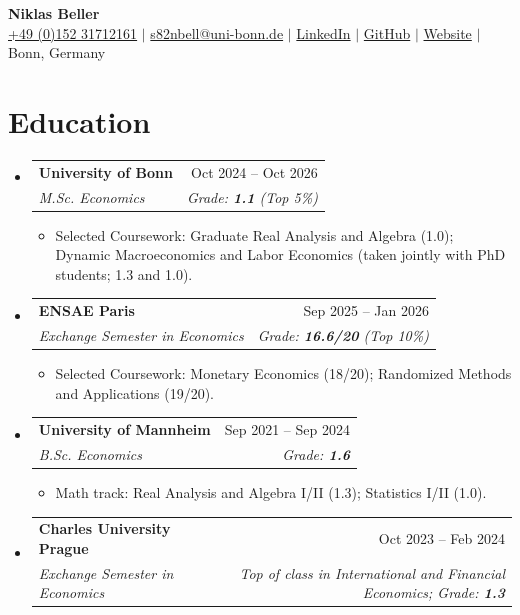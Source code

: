 \documentclass[a4paper,10pt]{article}
\makeatletter
\newcommand{\resumeItem}[1]{
  \item\small{{#1 \vspace{-2pt}}}
}
\newcommand{\gradevalue}[1]{{\bfseries\normalsize #1}}
\newcommand{\resumeSubheading}[4]{
  \vspace{-2pt}\item
    \begin{tabular*}{0.97\textwidth}[t]{l@{\extracolsep{\fill}}r}
      \textbf{#1} & #2 \\
      \textit{\small #3} & \textit{\small #4} \\
    \end{tabular*}\vspace{-7pt}
}
\newcommand{\resumeSubHeadingListStart}{\begin{itemize}[leftmargin=0.15in, label={}]}
\newcommand{\resumeSubHeadingListEnd}{\end{itemize}}
\newcommand{\resumeItemListStart}{\begin{itemize}[leftmargin=0.2in, itemsep=1pt, parsep=0pt, topsep=2pt]}
\newcommand{\resumeItemListEnd}{\end{itemize}\vspace{-6pt}}
\makeatother
\begin{document}
\begin{center}
    {\Huge \bfseries Niklas Beller} \\ \vspace{4pt}
    \small
    \faMobile \hspace{.5pt} \href{tel:+4915231712161}{+49 (0)152 31712161}
    $|$
    \faAt \hspace{.5pt} \href{mailto:s82nbell@uni-bonn.de}{s82nbell@uni-bonn.de}
    $|$
    \faLinkedinSquare \hspace{.5pt} \href{https://www.linkedin.com/in/niklas-beller-2204881b4/}{LinkedIn}
    $|$
    \faGithub \hspace{.5pt} \href{https://github.com/BellerNiklas}{GitHub}
    $|$
    \faGlobe \hspace{.5pt} \href{https://BellerNiklas.github.io}{Website}
    $|$
    \faMapMarker \hspace{.5pt} Bonn, Germany
\end{center}

\section{Education}
  \resumeSubHeadingListStart
    \resumeSubheading
      {University of Bonn}{Oct 2024 -- Oct 2026}
      {M.Sc. Economics}{Grade: \gradevalue{1.1} (Top 5\%)}
      \resumeItemListStart
        \resumeItem{Selected Coursework: Graduate Real Analysis and Algebra (1.0); Dynamic Macroeconomics and Labor Economics (taken jointly with PhD students; 1.3 and 1.0).}
      \resumeItemListEnd

    \resumeSubheading
      {ENSAE Paris}{Sep 2025 -- Jan 2026}
      {Exchange Semester in Economics}{Grade: \gradevalue{16.6/20} (Top 10\%)}
      \resumeItemListStart
        \resumeItem{Selected Coursework: Monetary Economics (18/20); Randomized Methods and Applications (19/20).}
      \resumeItemListEnd

    \resumeSubheading
      {University of Mannheim}{Sep 2021 -- Sep 2024}
      {B.Sc. Economics}{Grade: \gradevalue{1.6}}
      \resumeItemListStart
        \resumeItem{Math track: Real Analysis and Algebra I/II (1.3); Statistics I/II (1.0).}
      \resumeItemListEnd

    \resumeSubheading
      {Charles University Prague}{Oct 2023 -- Feb 2024}
      {Exchange Semester in Economics}{Top of class in International and Financial Economics; Grade: \gradevalue{1.3}}
  \resumeSubHeadingListEnd
\end{document}
